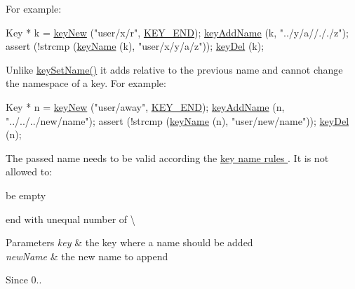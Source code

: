 For example\+: 
\begin{DoxyCodeInclude}
Key * k = \hyperlink{group__key_gad23c65b44bf48d773759e1f9a4d43b89}{keyNew} (\textcolor{stringliteral}{"user/x/r"}, \hyperlink{group__key_gga91fb3178848bd682000958089abbaf40aa8adb6fcb92dec58fb19410eacfdd403}{KEY\_END});
\hyperlink{group__keyname_gaa70593a2c772c4b7bc33423b9b10a270}{keyAddName} (k, \textcolor{stringliteral}{"../y/a//././z"});
assert (!strcmp (\hyperlink{group__keyname_ga8e805c726a60da921d3736cda7813513}{keyName} (k), \textcolor{stringliteral}{"user/x/y/a/z"}));
\hyperlink{group__key_ga3df95bbc2494e3e6703ece5639be5bb1}{keyDel} (k);
\end{DoxyCodeInclude}
 Unlike \hyperlink{group__keyname_ga7699091610e7f3f43d2949514a4b35d9}{key\+Set\+Name()} it adds relative to the previous name and cannot change the namespace of a key. For example\+: 
\begin{DoxyCodeInclude}
Key * n = \hyperlink{group__key_gad23c65b44bf48d773759e1f9a4d43b89}{keyNew} (\textcolor{stringliteral}{"user/away"}, \hyperlink{group__key_gga91fb3178848bd682000958089abbaf40aa8adb6fcb92dec58fb19410eacfdd403}{KEY\_END});
\hyperlink{group__keyname_gaa70593a2c772c4b7bc33423b9b10a270}{keyAddName} (n, \textcolor{stringliteral}{"../../../new/name"});
assert (!strcmp (\hyperlink{group__keyname_ga8e805c726a60da921d3736cda7813513}{keyName} (n), \textcolor{stringliteral}{"user/new/name"}));
\hyperlink{group__key_ga3df95bbc2494e3e6703ece5639be5bb1}{keyDel} (n);
\end{DoxyCodeInclude}
 The passed name needs to be valid according the \hyperlink{group__keyname}{key name rules }. It is not allowed to\+:
\begin{DoxyItemize}
\item be empty
\item end with unequal number of \textbackslash{}
\end{DoxyItemize}


\begin{DoxyParams}{Parameters}
{\em key} & the key where a name should be added \\
\hline
{\em new\+Name} & the new name to append\\
\hline
\end{DoxyParams}
\begin{DoxySince}{Since}
0..
\end{DoxySince}

